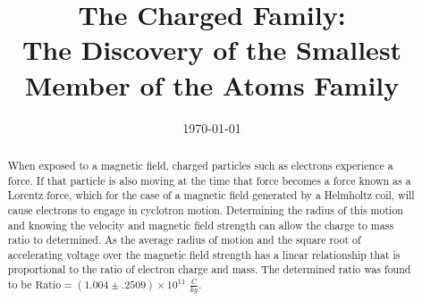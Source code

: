 \documentclass[%
 reprint,
 amsmath,amssymb,
 aps,
]{revtex4-2}
\begin{document}

\title{The Charged Family:\\The Discovery of the Smallest Member of the Atoms Family}%




\date{\today}%


\begin{abstract}
When exposed to a magnetic field, charged particles such as electrons experience a force. If that particle is also moving at the time that force becomes a force known as a Lorentz force, which for the case of a magnetic field generated by a Helmholtz coil, will cause electrons to engage in cyclotron motion. Determining the radius of this motion and knowing the velocity and magnetic field strength can allow the charge to mass ratio to determined. As the average radius of motion and the square root of accelerating voltage over the magnetic field strength has a linear relationship that is proportional to the ratio of electron charge and mass. The determined ratio was found to be $\text{Ratio} = ( 1.004 \pm .2509 )\times 10^{11}$ $\frac{C}{kg}$.
\end{abstract}
\end{document}
